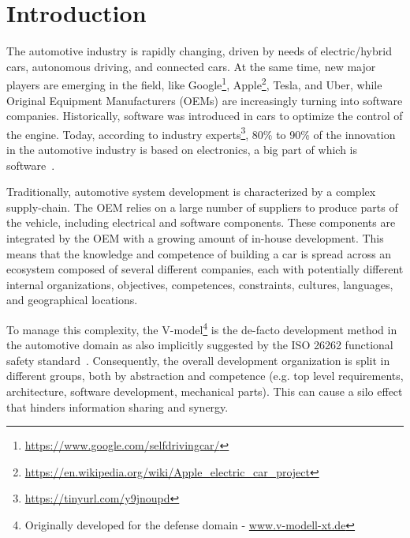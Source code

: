 \section{Introduction}\label{sec:intro}


The automotive industry is rapidly %
changing, driven by needs of 
electric/hybrid cars, autonomous driving, and connected cars. 
At the same time, new major players are emerging in the field, like Google\footnote{\url{https://www.google.com/selfdrivingcar/}},  %
Apple\footnote{\url{https://en.wikipedia.org/wiki/Apple_electric_car_project}}, %
 Tesla, and Uber, while Original Equipment Manufacturers (OEMs) are increasingly turning into software companies. 
Historically, software was introduced in cars to optimize the control of the engine. 
Today, according to industry experts\footnote{\url{https://tinyurl.com/y9jnoupd}}, 80\% to 90\% of the innovation in the automotive industry is based on electronics, a big part of which is software~\cite{ESEM2016}. 

Traditionally, automotive system development is characterized by a complex supply-chain.
The OEM relies on a large number of suppliers to produce parts of the vehicle, including electrical and software components.
These components are integrated by the OEM with a growing amount of in-house development.
This means that the knowledge and competence of building a car is spread across an ecosystem composed of several different companies, each with potentially different internal organizations, objectives, competences, constraints, cultures, languages, and geographical locations. 

To manage this complexity, the V-model\footnote{Originally developed for the defense domain %
- \url{www.v-modell-xt.de}} %
is the de-facto development method in the automotive domain as also implicitly suggested by the ISO 26262 functional safety standard~\cite{iso26262}.
Consequently, the overall development organization is split in different groups, both by abstraction and competence (e.g. top level requirements,
architecture, software development, mechanical parts). %
This can cause a silo effect that hinders information sharing and synergy. %


